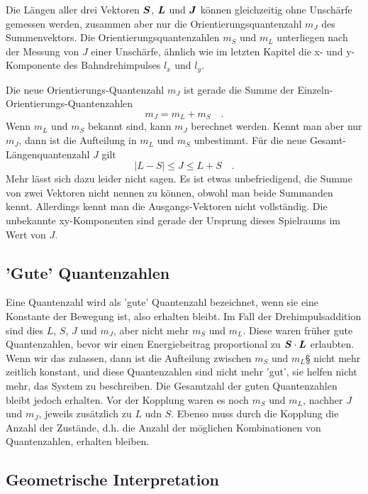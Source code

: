 Die Längen aller drei Vektoren $\boldsymbol{S}$, $\boldsymbol{L}$ und $\boldsymbol{J}$ können gleichzeitig ohne Unschärfe gemessen werden, zusammen aber nur die Orientierungsquantenzahl $m_J$ des Summenvektors. Die Orientierungsquantenzahlen $m_S$ und $m_L$ unterliegen nach der Messung von $J$ einer Unschärfe, ähnlich wie im letzten Kapitel die x- und y-Komponente des Bahndrehimpulses $l_x$ und $l_y$.

Die neue Orientierungs-Quantenzahl $m_J$ ist gerade die Summe der Einzeln-Orientierungs-Quantenzahlen
\begin{equation}
 m_J  = m_L + m_S \quad .
\end{equation}
Wenn $m_L$ und $m_S$ bekannt sind, kann $m_J$ berechnet werden. Kennt man aber nur $m_J$, dann ist die Aufteilung in $m_L$ und $m_S$ unbestimmt.  Für die neue Gesamt-Längenquantenzahl $J$ gilt
\begin{equation}
 | L - S | \le J \le  L + S \quad .
\end{equation}
Mehr lässt sich dazu leider nicht sagen. Es ist etwas unbefriedigend, die Summe von zwei Vektoren nicht nennen zu können, obwohl man beide Summanden kennt. Allerdings kennt man die Ausgangs-Vektoren nicht vollständig. Die unbekannte xy-Komponenten sind gerade der Ursprung dieses Spielraums im Wert von $J$.

\subsection{'Gute' Quantenzahlen}

Eine Quantenzahl wird als 'gute' Quantenzahl bezeichnet, wenn sie eine Konstante der Bewegung ist, also erhalten bleibt. Im Fall der Drehimpulsaddition sind dies $L$, $S$, $J$ und $m_J$, aber nicht mehr $m_S$ und $m_L$. Diese waren früher gute Quantenzahlen, bevor wir einen Energiebeitrag proportional zu $\boldsymbol{S} \cdot \boldsymbol{L}$ erlaubten. Wenn wir das zulassen, dann ist die Aufteilung zwischen $m_S$ und $m_L$§ nicht mehr zeitlich konstant, und diese Quantenzahlen sind nicht mehr 'gut', sie helfen nicht mehr, das System zu beschreiben. Die Gesamtzahl der guten Quantenzahlen bleibt jedoch erhalten. Vor der Kopplung waren es noch $m_S$ und $m_L$, nachher $J$ und $m_J$, jeweils zusätzlich zu $L$ udn $S$. Ebenso muss durch die Kopplung die Anzahl der Zustände, d.h. die Anzahl der möglichen Kombinationen von Quantenzahlen, erhalten bleiben.



\subsection{Geometrische Interpretation}

